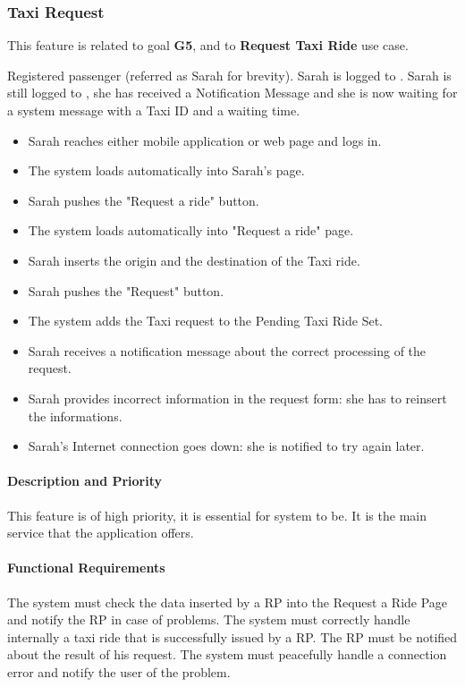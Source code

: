 \subsubsection{Taxi Request}
This feature is related to goal \textbf{G5}, and to \textbf{Request Taxi Ride} use case.
\begin{itemize}
	 Registered passenger (referred as Sarah for brevity).
	 Sarah is logged to \myTaxiService{}.
	 Sarah is still logged to \myTaxiService{}, she has received a Notification Message and she is now waiting for a system message with a Taxi ID and a waiting time.
	\begin{itemize}
		\item Sarah reaches either \myTaxiService{} mobile application or web page and logs in.
		\item The system loads automatically into Sarah's page.
		\item Sarah pushes the "Request a ride" button.
		\item The system loads automatically into "Request a ride" page.
		\item Sarah inserts the origin and the destination of the Taxi ride.
		\item Sarah pushes the "Request" button.
		\item The system adds the Taxi request to the Pending Taxi Ride Set.
		\item Sarah receives a notification message about the correct processing of the request. 
	\end{itemize}
	\begin{itemize}
		\item Sarah provides incorrect information in the request form: she has to reinsert the informations.
		\item Sarah's Internet connection goes down: she is notified to try again later.
	\end{itemize}
\end{itemize}
\paragraph{Description and Priority}
This feature is of high priority, it is essential for \myTaxiService{} system to be. It is the main service that the application offers.
\paragraph{Functional Requirements}
\begin{itemize}
	 The system must check the data inserted by a RP into the Request a Ride Page and notify the RP in case of problems.
	 The system must correctly handle internally a taxi ride that is successfully issued by a RP.
	 The RP must be notified about the result of his request.
	 The system must peacefully handle a connection error and notify the user of the problem.
\end{itemize}
